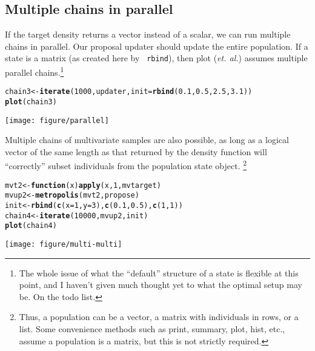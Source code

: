 \documentclass{article}\usepackage[]{graphicx}\usepackage[]{color}
\makeatletter
\def\maxwidth{ %
  \ifdim\Gin@nat@width>\linewidth
    \linewidth
  \else
    \Gin@nat@width
  \fi
}
\newcommand{\hlnum}[1]{\textcolor[rgb]{0.686,0.059,0.569}{#1}}%
\newcommand{\hlstd}[1]{\textcolor[rgb]{0.345,0.345,0.345}{#1}}%
\newcommand{\hlkwa}[1]{\textcolor[rgb]{0.161,0.373,0.58}{\textbf{#1}}}%
\newcommand{\hlkwb}[1]{\textcolor[rgb]{0.69,0.353,0.396}{#1}}%
\newcommand{\hlkwc}[1]{\textcolor[rgb]{0.333,0.667,0.333}{#1}}%
\newcommand{\hlkwd}[1]{\textcolor[rgb]{0.737,0.353,0.396}{\textbf{#1}}}%
\newenvironment{kframe}{%
 \def\at@end@of@kframe{}%
 \ifinner\ifhmode%
  \def\at@end@of@kframe{\end{minipage}}%
  \begin{minipage}{\columnwidth}%
 \fi\fi%
 \def\FrameCommand##1{\hskip\@totalleftmargin \hskip-\fboxsep
 \colorbox{shadecolor}{##1}\hskip-\fboxsep
     \hskip-\linewidth \hskip-\@totalleftmargin \hskip\columnwidth}%
 \MakeFramed {\advance\hsize-\width
   \@totalleftmargin\z@ \linewidth\hsize
   \@setminipage}}%
 {\par\unskip\endMakeFramed%
 \at@end@of@kframe}
\newenvironment{knitrout}{}{} %
\makeatother
\begin{document}
\subsection{Multiple chains in parallel}
If the target density returns a vector instead of a scalar, we can run
multiple chains in parallel. Our proposal updater should update the
entire population. If a state is a matrix (as created here by {\tt
  rbind}), then plot ({\it et. al.}) assumes multiple parallel
chains.\footnote{The whole issue of what the ``default'' structure of
  a state is flexible at this point, and I haven't given much
  thought yet to what the optimal setup may be. On the todo list.}
\begin{knitrout}
\color{fgcolor}\begin{kframe}
\begin{alltt}
\hlstd{chain3} \hlkwb{<-} \hlkwd{iterate}\hlstd{(}\hlnum{1000}\hlstd{, updater,} \hlkwc{init} \hlstd{=} \hlkwd{rbind}\hlstd{(}\hlnum{0.1}\hlstd{,} \hlnum{0.5}\hlstd{,} \hlnum{2.5}\hlstd{,} \hlnum{3.1}\hlstd{))}
\hlkwd{plot}\hlstd{(chain3)}
\end{alltt}
\end{kframe}

{\centering \texttt{[image: figure/parallel]} 

}



\end{knitrout}


Multiple chains of multivariate samples are also possible, as long as
a logical vector of the same length as that returned by the density
function will ``correctly'' subset individuals from the population
state object. \footnote{Thus, a population can be a vector, a matrix with
individuals in rows, or a list. Some convenience methods such as
print, summary, plot, hist, etc., assume a population is a matrix, but
this is not strictly required.}
\begin{knitrout}
\color{fgcolor}\begin{kframe}
\begin{alltt}
\hlstd{mvt2} \hlkwb{<-} \hlkwa{function}\hlstd{(}\hlkwc{x}\hlstd{)} \hlkwd{apply}\hlstd{(x,} \hlnum{1}\hlstd{, mvtarget)}
\hlstd{mvup2} \hlkwb{<-} \hlkwd{metropolis}\hlstd{(mvt2, propose)}
\hlstd{init} \hlkwb{<-} \hlkwd{rbind}\hlstd{(}\hlkwd{c}\hlstd{(}\hlkwc{x} \hlstd{=} \hlnum{1}\hlstd{,} \hlkwc{y} \hlstd{=} \hlnum{3}\hlstd{),} \hlkwd{c}\hlstd{(}\hlnum{0.1}\hlstd{,} \hlnum{0.5}\hlstd{),} \hlkwd{c}\hlstd{(}\hlnum{1}\hlstd{,} \hlnum{1}\hlstd{))}
\hlstd{chain4} \hlkwb{<-} \hlkwd{iterate}\hlstd{(}\hlnum{10000}\hlstd{, mvup2, init)}
\hlkwd{plot}\hlstd{(chain4)}
\end{alltt}
\end{kframe}

{\centering \texttt{[image: figure/multi-multi]} 

}



\end{knitrout}
\end{document}
